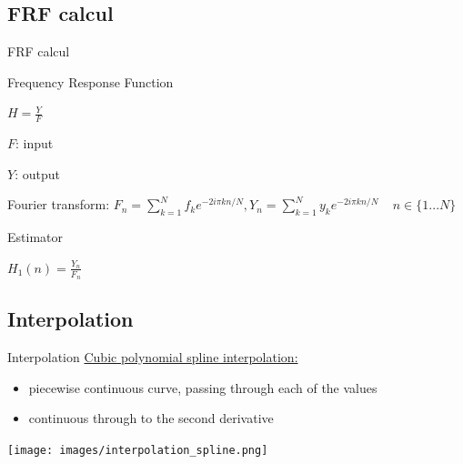 \documentclass{beamer}
\begin{document}
\subsection{FRF calcul}
\begin{frame}{FRF calcul}
\begin{exampleblock}{Frequency Response Function}
\begin{center}
$H = \frac{Y}{F}$
\end{center}
$F$: input

$Y$: output
\end{exampleblock}

\pause

Fourier transform:
$
F_n = \sum\limits_{k=1}^N f_k e^{-2i\pi kn/N},
Y_n = \sum\limits_{k=1}^N y_k e^{-2i\pi kn/N} \ \ \ \ \ n \in \{1 ... N\}
$


\begin{block}{Estimator}
\begin{center}
$H_1(n) = \frac{Y_n}{F_n}$
\end{center}
\end{block}

\end{frame}

\subsection{Interpolation}
\begin{frame}{Interpolation}
\underline{Cubic polynomial spline interpolation:}
\begin{itemize}
\item piecewise continuous curve, passing through each of the values
\item continuous through to the second derivative
\end{itemize}

\begin{center}
\texttt{[image: images/interpolation\_spline.png]}
\end{center}

\end{frame}
\end{document}
